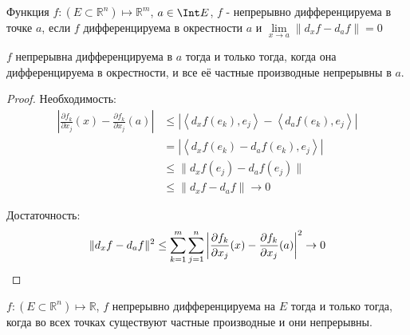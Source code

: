 \begin{definition} \thmslashn 

    Функция $f : (E \subset \mathbb{R}^{n}) \mapsto \mathbb{R}^{m}$, $a\in \Int E$, $f$ - непрерывно дифференцируема в точке $a$, если $f$ дифференцируема в окрестности $a$ и $\lim\limits_{x \to a} \|d_{x}f - d_{a}f\| = 0$
\end{definition}
\begin{theorem} \thmslashn

    $f$ непрерывна дифференцируема в $a$ тогда и только тогда, когда она дифференцируема в окрестности, и все её частные производные непрерывны в $a$.
    \begin{proof} \thmslashn
    

        Необходимость:
        \begin{equation*}
            \begin{split}
                \left| \frac{\partial f_{k}}{\partial x_{j}}(x) - \frac{\partial f_{k}}{\partial x_{j}}(a)  \right|
                &\le \left| \left<d_{x}f(e_{k}), e_{j}\right> - \left<d_{a}f(e_{k}), e_{j}\right>\right|\\
                &= \left|\left<d_{x}f(e_{k}) - d_{a}f(e_{k}), e_{j}\right>\right|\\
                &\le \|d_{x}f(e_{j})-d_{a}f(e_{j})\|\\
                &\le \|d_{x}f - d_{a}f\| \to 0
            \end{split}
        \end{equation*}

        Достаточность:
        \begin{equation*}
            \begin{split}
                \|d_{x}f-d_{a}f\|^2 \le \sum\limits_{k=1}^{m}\sum\limits_{j=1}^{n} \left| \frac{\partial f_{k}}{\partial x_{j}}(x) - \frac{\partial f_{k}}{\partial x_{j}}(a)  \right|^2 \to 0\qedhere
            \end{split}
        \end{equation*}
    \end{proof}
\end{theorem}
\begin{consequence} \thmslashn

    $f : (E \subset \mathbb{R}^{n}) \mapsto \mathbb{R}$, $f$ непрерывно дифференцируема на $E$ тогда и только тогда, когда во всех точках существуют частные производные и они непрерывны.
\end{consequence}
